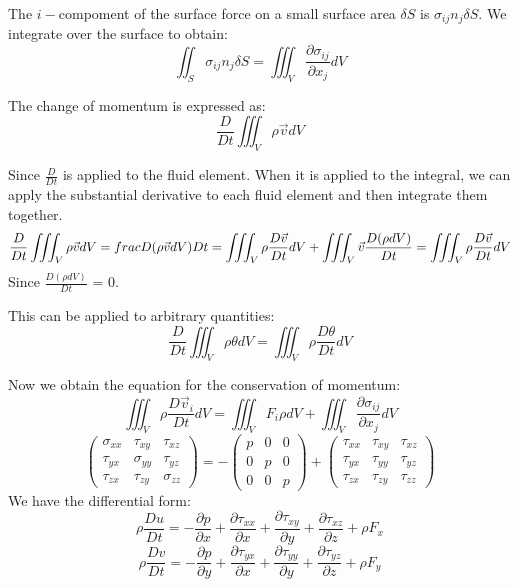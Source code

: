 \documentclass[11pt]{article} %
\begin{document}
\par
The $i-$compoment of the surface force on a small surface area $\delta S$ is $\sigma_{ij}n_{j}\delta S$. We integrate over the surface to obtain:
$$
\iint_{S}\sigma_{ij}n_{j}\delta S = \iiint_{V} \frac{\partial \sigma_{ij}}{\partial x_{j}}dV
$$\par 
The change of momentum is expressed as:
$$
\frac{D}{Dt}\iiint_{V} \rho \vec{v}dV 
$$\par
Since $\frac{D}{Dt}$ is applied to the fluid element. When it is applied to the integral, we can apply the substantial derivative to each fluid element and then integrate them together. 
$$
\frac{D}{Dt}\iiint_{V} \rho \vec{v}dV  = \\frac{D(\rho \vec{v}dV)}{Dt}  = \iiint_{V}\rho \frac{D\vec{v}}{Dt} dV+\iiint_{V}\vec{v}\frac{D(\rho dV)}{Dt} = \iiint_{V}\rho \frac{D\vec{v}}{Dt} dV
$$Since $\frac{D(\rho dV)}{Dt}$ = 0.\par
This can be applied to arbitrary quantities:
$$
\frac{D}{Dt}\iiint_{V} \rho \theta dV = \iiint_{V}\rho \frac{D\theta}{Dt} dV
$$\par
Now we obtain the equation for the conservation of momentum:
\begin{equation}
\iiint_{V}\rho \frac{D\vec{v}_{i}}{Dt} dV = \iiint_{V}F_{i}\rho dV + \iiint_{V} \frac{\partial \sigma_{ij}}{\partial x_{j}}dV
\end{equation}
$$
\left(
\begin{array} {ccc}
\sigma_{xx} & \tau_{xy} & \tau_{xz} \\
\tau_{yx} & \sigma_{yy} & \tau_{yz} \\
\tau_{zx} & \tau_{zy} &\sigma_{zz}
\end{array}
\right)
=-
\left(
\begin{array} {ccc}
p & 0 & 0 \\
0 & p & 0 \\
0 & 0 &p
\end{array}
\right) +
\left(
\begin{array} {ccc}
\tau_{xx}  & \tau_{xy} & \tau_{xz} \\
\tau_{yx} & \tau_{yy}& \tau_{yz} \\
\tau_{zx} & \tau_{zy} &\tau_{zz}
\end{array}
\right)
$$
We have the differential form:
$$
\rho \frac{Du}{Dt} = - \frac{\partial p}{\partial x}+\frac{\partial \tau_{xx}}{\partial x}+\frac{\partial \tau_{xy}}{\partial y} + \frac{\partial \tau_{xz}}{\partial z} +\rho F_{x}
$$
$$
\rho \frac{Dv}{Dt} = - \frac{\partial p}{\partial y}+\frac{\partial \tau_{yx}}{\partial x}+\frac{\partial \tau_{yy}}{\partial y} + \frac{\partial \tau_{yz}}{\partial z} +\rho F_{y}
$$
\end{document}
